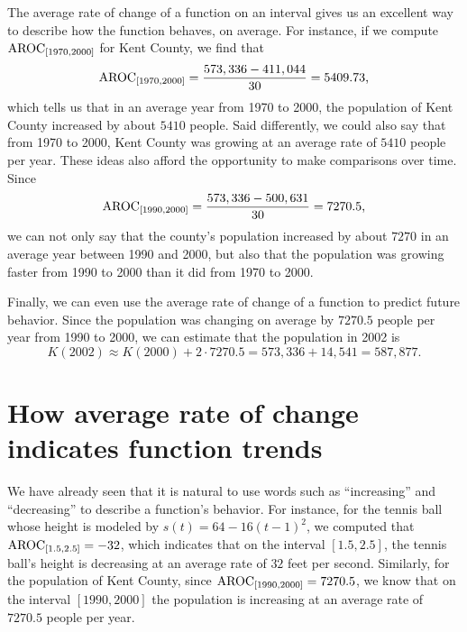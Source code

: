 \documentclass[nooutcomes]{ximera}
\begin{document}
The average rate of change of a function on an interval gives us an excellent way to describe how the function behaves, on average.  For instance, if we compute $\mathrm{AROC}_{[1970,2000]}$ for Kent County, we find that%
\begin{equation*}
\mathrm{AROC}_{[1970,2000]} = \frac{573,336 - 411,044}{30} = 5409.73\text{,}
\end{equation*}
which tells us that in an average year from 1970 to 2000, the population of Kent County increased by about $5410$ people.  Said differently, we could also say that from 1970 to 2000, Kent County was growing at an average rate of $5410$ people per year.  These ideas also afford the opportunity to make comparisons over time.  Since%
\begin{equation*}
\mathrm{AROC}_{[1990,2000]} = \frac{573,336 - 500,631}{30} = 7270.5\text{,}
\end{equation*}
we can not only say that the county's population increased by about $7270$ in an average year between 1990 and 2000, but also that the population was growing faster from 1990 to 2000 than it did from 1970 to 2000.%

Finally, we can even use the average rate of change of a function to predict future behavior.  Since the population was changing on average by $7270.5$ people per year from 1990 to 2000, we can estimate that the population in 2002 is%
\begin{equation*}
K(2002) \approx K(2000) + 2 \cdot 7270.5 = 573,336 + 14,541 = 587,877\text{.}
\end{equation*}



\section{How average rate of change indicates function trends}

We have already seen that it is natural to use words such as ``increasing'' and ``decreasing'' to describe a function's behavior.  For instance, for the tennis ball whose height is modeled by $s(t) = 64 - 16(t-1)^2$, we computed that $\mathrm{AROC}_{[1.5,2.5]} = -32$, which indicates that on the interval $[1.5,2.5]$, the tennis ball's height is decreasing at an average rate of $32$ feet per second.  Similarly, for the population of Kent County, since $\mathrm{AROC}_{[1990,2000]} = 7270.5$, we know that on the interval $[1990,2000]$ the population is increasing at an average rate of $7270.5$ people per year.
\end{document}
